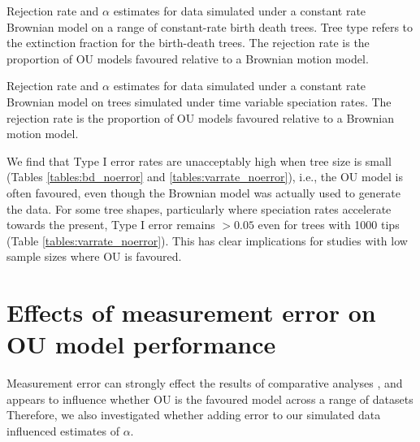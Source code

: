 \documentclass[a4paper,12pt]{article}
\begin{document}
      \begin{table}[!htbp]
        \begin{center}
        \caption{Rejection rate and $\alpha$ estimates for data simulated under a constant rate Brownian model on a range of constant-rate birth death trees. Tree type refers to the extinction fraction for the birth-death trees. The rejection rate is the proportion of OU models favoured relative to a Brownian motion model.}
        \bigskip
        
        \label{tables:bd_noerror}
        \end{center}
      \end{table}

      \begin{table}[!htbp]
        \begin{center}
        \caption{Rejection rate and $\alpha$ estimates for data simulated under a constant rate Brownian model on trees simulated under time variable speciation rates. The rejection rate is the proportion of OU models favoured relative to a Brownian motion model.}
        \bigskip
        
        \label{tables:varrate_noerror}
        \end{center}
      \end{table}

    We find that Type I error rates are unacceptably high when tree size is small (Tables \ref{tables:bd_noerror} and \ref{tables:varrate_noerror}), i.e., the OU model is often favoured, even though the Brownian model was actually used to generate the data. 
    For some tree shapes, particularly where speciation rates accelerate towards the present, Type I error remains $>0.05$ even for trees with 1000 tips (Table \ref{tables:varrate_noerror}).
    This has clear implications for studies with low sample sizes where OU is favoured.

    
\section{Effects of measurement error on OU model performance}
  Measurement error can strongly effect the results of comparative analyses \cite{silvestro2015}, and appears to influence whether OU is the favoured model across a range of datasets \citep{} %
  Therefore, we also investigated whether adding error to our simulated data influenced estimates of $\alpha$.
  
\end{document}
